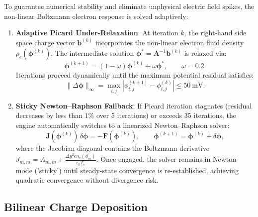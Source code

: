 \documentclass[11pt,a4paper]{article}
\begin{document}
To guarantee numerical stability and eliminate unphysical electric field spikes, the non-linear Boltzmann electron response is solved adaptively:
\begin{enumerate}[nosep]
    \item \textbf{Adaptive Picard Under-Relaxation}: At iteration $k$, the right-hand side space charge vector $\mathbf{b}^{(k)}$ incorporates the non-linear electron fluid density $\rho_e(\boldsymbol{\phi}^{(k)})$. The intermediate solution $\boldsymbol{\phi}^* = \mathbf{A}^{-1} \mathbf{b}^{(k)}$ is relaxed via:
    \begin{equation}
        \boldsymbol{\phi}^{(k+1)} = (1 - \omega) \boldsymbol{\phi}^{(k)} + \omega \boldsymbol{\phi}^*, \qquad \omega = 0.2.
    \end{equation}
    Iterations proceed dynamically until the maximum potential residual satisfies:
    \begin{equation}
        \|\Delta \boldsymbol{\phi}\|_{\infty} = \max_{i,j} \left|\phi_{i,j}^{(k+1)} - \phi_{i,j}^{(k)}\right| \le \SI{50}{\milli\volt}.
    \end{equation}
    \item \textbf{Sticky Newton--Raphson Fallback}: If Picard iteration stagnates (residual decreases by less than $1\%$ over 5 iterations) or exceeds 35 iterations, the engine automatically switches to a linearized Newton--Raphson solver:
    \begin{equation}
        \mathbf{J}(\boldsymbol{\phi}^{(k)}) \, \delta \boldsymbol{\phi} = -\mathbf{F}(\boldsymbol{\phi}^{(k)}), \qquad \boldsymbol{\phi}^{(k+1)} = \boldsymbol{\phi}^{(k)} + \delta \boldsymbol{\phi},
    \end{equation}
    where the Jacobian diagonal contains the Boltzmann derivative $J_{m,m} = A_{m,m} + \frac{\Delta y^2 e n_e(\phi_m)}{\varepsilon_0 T_e}$. Once engaged, the solver remains in Newton mode ('sticky') until steady-state convergence is re-established, achieving quadratic convergence without divergence risk.
\end{enumerate}

\subsection{Bilinear Charge Deposition}
\end{document}
